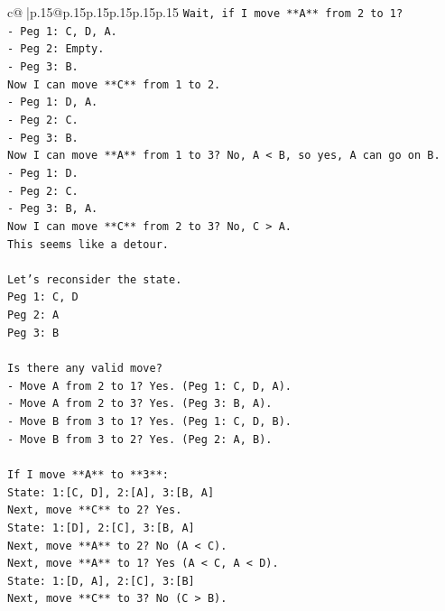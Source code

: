 \documentclass{article}
\begin{document}
{\begin{supertabular}{c@{$\;$}|p{.15\linewidth}@{}p{.15\linewidth}p{.15\linewidth}p{.15\linewidth}p{.15\linewidth}p{.15\linewidth}}
{{{\texttt{Wait, if I move **A** from 2 to 1?} \\
\texttt{{-} Peg 1: C, D, A.} \\
\texttt{{-} Peg 2: Empty.} \\
\texttt{{-} Peg 3: B.} \\
\texttt{Now I can move **C** from 1 to 2.} \\
\texttt{{-} Peg 1: D, A.} \\
\texttt{{-} Peg 2: C.} \\
\texttt{{-} Peg 3: B.} \\
\texttt{Now I can move **A** from 1 to 3? No, A < B, so yes, A can go on B.} \\
\texttt{{-} Peg 1: D.} \\
\texttt{{-} Peg 2: C.} \\
\texttt{{-} Peg 3: B, A.} \\
\texttt{Now I can move **C** from 2 to 3? No, C > A.} \\
\texttt{This seems like a detour.} \\
\\ 
\texttt{Let's reconsider the state.} \\
\texttt{Peg 1: C, D} \\
\texttt{Peg 2: A} \\
\texttt{Peg 3: B} \\
\\ 
\texttt{Is there any valid move?} \\
\texttt{{-} Move A from 2 to 1? Yes. (Peg 1: C, D, A).} \\
\texttt{{-} Move A from 2 to 3? Yes. (Peg 3: B, A).} \\
\texttt{{-} Move B from 3 to 1? Yes. (Peg 1: C, D, B).} \\
\texttt{{-} Move B from 3 to 2? Yes. (Peg 2: A, B).} \\
\\ 
\texttt{If I move **A** to **3**:} \\
\texttt{State: 1:{[}C, D{]}, 2:{[}A{]}, 3:{[}B, A{]}} \\
\texttt{Next, move **C** to 2? Yes.} \\
\texttt{State: 1:{[}D{]}, 2:{[}C{]}, 3:{[}B, A{]}} \\
\texttt{Next, move **A** to 2? No (A < C).} \\
\texttt{Next, move **A** to 1? Yes (A < C, A < D).} \\
\texttt{State: 1:{[}D, A{]}, 2:{[}C{]}, 3:{[}B{]}} \\
\texttt{Next, move **C** to 3? No (C > B).} \\
}}}
\end{supertabular}}
\end{document}
